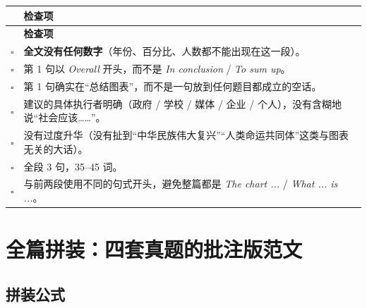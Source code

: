 \documentclass[11pt,a4paper]{ctexart}
\newcommand{\en}[1]{\textit{#1}}
\newcommand{\cb}{$\square$}
\begin{document}
\begin{longtable}{C{0.8cm} L{13.6cm}}
\toprule
& \textbf{检查项}\\
\midrule
\endfirsthead
\toprule
& \textbf{检查项}\\
\midrule
\endhead
\cb & \textbf{全文没有任何数字}（年份、百分比、人数都不能出现在这一段）。\\
\cb & 第 1 句以 \en{Overall} 开头，而不是 \en{In conclusion} / \en{To sum up}。\\
\cb & 第 1 句确实在“总结图表”，而不是一句放到任何题目都成立的空话。\\
\cb & 建议的具体执行者明确（政府 / 学校 / 媒体 / 企业 / 个人），没有含糊地说“社会应该……”。\\
\cb & 没有过度升华（没有扯到“中华民族伟大复兴”“人类命运共同体”这类与图表无关的大话）。\\
\cb & 全段 3 句，35--45 词。\\
\cb & 与前两段使用不同的句式开头，避免整篇都是 \en{The chart ...} / \en{What ... is ...}。\\
\bottomrule
\end{longtable}

\clearpage

\section{全篇拼装：四套真题的批注版范文}

\subsection{拼装公式}
\end{document}
